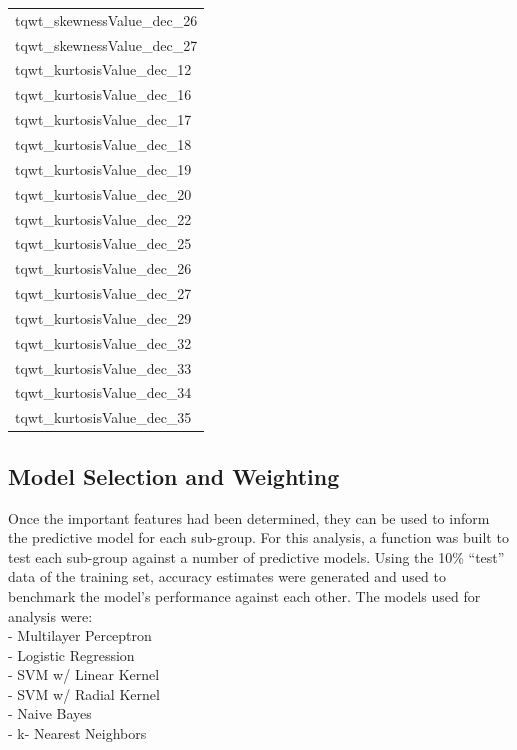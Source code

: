 \documentclass[
]{article}
\begin{document}
\begin{table}
\begin{tabular}{l}
tqwt\_skewnessValue\_dec\_26\\
tqwt\_skewnessValue\_dec\_27\\
\addlinespace
tqwt\_kurtosisValue\_dec\_12\\
tqwt\_kurtosisValue\_dec\_16\\
tqwt\_kurtosisValue\_dec\_17\\
tqwt\_kurtosisValue\_dec\_18\\
tqwt\_kurtosisValue\_dec\_19\\
\addlinespace
tqwt\_kurtosisValue\_dec\_20\\
tqwt\_kurtosisValue\_dec\_22\\
tqwt\_kurtosisValue\_dec\_25\\
tqwt\_kurtosisValue\_dec\_26\\
tqwt\_kurtosisValue\_dec\_27\\
\addlinespace
tqwt\_kurtosisValue\_dec\_29\\
tqwt\_kurtosisValue\_dec\_32\\
tqwt\_kurtosisValue\_dec\_33\\
tqwt\_kurtosisValue\_dec\_34\\
tqwt\_kurtosisValue\_dec\_35\\
\bottomrule
\end{tabular}
\end{table}
\newpage

\hypertarget{model-selection-and-weighting}{%
\subsection{Model Selection and Weighting}\label{model-selection-and-weighting}}

Once the important features had been determined, they can be used to inform the predictive model for each sub-group.
For this analysis, a function was built to test each sub-group against a number of predictive models. Using the 10\% ``test'' data of the training set, accuracy estimates were generated and used to benchmark the model's performance against each other. The models used for analysis were:\\
- Multilayer Perceptron\\
- Logistic Regression\\
- SVM w/ Linear Kernel\\
- SVM w/ Radial Kernel\\
- Naive Bayes\\
- k- Nearest Neighbors
\end{document}
